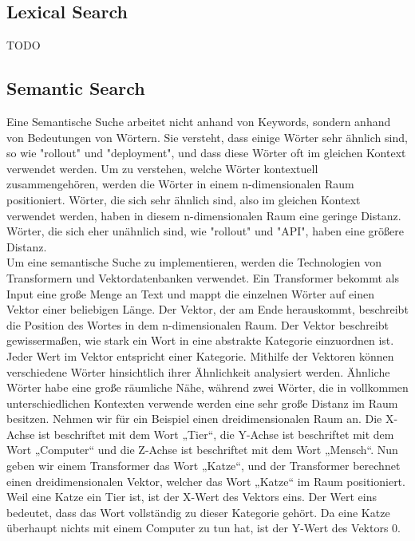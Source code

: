 \subsection{Lexical Search}
TODO

\subsection{Semantic Search}
Eine Semantische Suche arbeitet nicht anhand von Keywords, sondern anhand von Bedeutungen von Wörtern.
Sie versteht, dass einige Wörter sehr ähnlich sind, so wie "rollout" und "deployment", und dass diese Wörter oft im gleichen Kontext verwendet werden.
Um zu verstehen, welche Wörter kontextuell zusammengehören, werden die Wörter in einem n-dimensionalen Raum positioniert.
Wörter, die sich sehr ähnlich sind, also im gleichen Kontext verwendet werden, haben in diesem n-dimensionalen Raum eine geringe Distanz.
Wörter, die sich eher unähnlich sind, wie "rollout" und "API", haben eine größere Distanz.\\

Um eine semantische Suche zu implementieren, werden die Technologien von Transformern und Vektordatenbanken verwendet.
Ein Transformer bekommt als Input eine große Menge an Text und mappt die einzelnen Wörter auf einen Vektor einer beliebigen Länge.
Der Vektor, der am Ende herauskommt, beschreibt die Position des Wortes in dem n-dimensionalen Raum.
Der Vektor beschreibt gewissermaßen, wie stark ein Wort in eine abstrakte Kategorie einzuordnen ist.
Jeder Wert im Vektor entspricht einer Kategorie.
Mithilfe der Vektoren können verschiedene Wörter hinsichtlich ihrer Ähnlichkeit analysiert werden.
Ähnliche Wörter habe eine große räumliche Nähe, während zwei Wörter, die in vollkommen unterschiedlichen Kontexten verwende werden eine sehr große Distanz im Raum besitzen.
Nehmen wir für ein Beispiel einen dreidimensionalen Raum an.
Die X-Achse ist beschriftet mit dem Wort „Tier“, die Y-Achse ist beschriftet mit dem Wort „Computer“ und die Z-Achse ist beschriftet mit dem Wort „Mensch“.
Nun geben wir einem Transformer das Wort „Katze“, und der Transformer berechnet einen dreidimensionalen Vektor, welcher das Wort „Katze“ im Raum positioniert.
Weil eine Katze ein Tier ist, ist der X-Wert des Vektors eins.
Der Wert eins bedeutet, dass das Wort vollständig zu dieser Kategorie gehört.
Da eine Katze überhaupt nichts mit einem Computer zu tun hat, ist der Y-Wert des Vektors 0.\\

